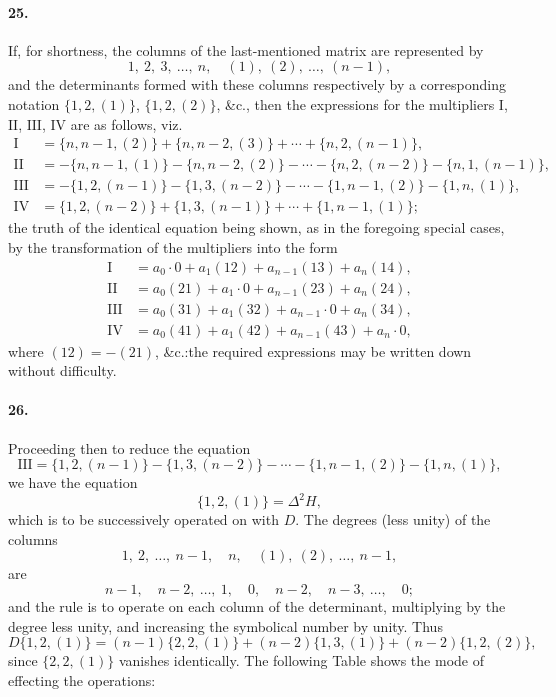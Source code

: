 \documentclass[12pt,a4paper]{article}
\theoremstyle{plain}
\begin{document}
\paragraph{25.}
If,  for  shortness,  the  columns  of  the  last-mentioned  matrix  are  represented  by
\[
1,\ 2,\ 3,\ \ldots,\ n,\quad (1),\ (2),\ \ldots,\ (n-1),
\]
and  the  determinants  formed  with  these  columns  respectively  by  a  corresponding
notation  $\{1, 2, (1)\}$, $\{1, 2, (2)\}$, \&c.,  then  the  expressions  for  the  multipliers  $\mathrm{I}$, $\mathrm{II}$, $\mathrm{III}$, $\mathrm{IV}$
are  as  follows,  viz.
\begin{align*}
\mathrm{I}   &= \{n, n-1, (2)\} + \{n, n-2, (3)\} + \cdots + \{n, 2, (n-1)\}, \\
\mathrm{II}  &= -\{n, n-1, (1)\} - \{n, n-2, (2)\} - \cdots - \{n, 2, (n-2)\} - \{n, 1, (n-1)\}, \\
\mathrm{III} &= -\{1, 2, (n-1)\} - \{1, 3, (n-2)\} - \cdots - \{1, n-1, (2)\} - \{1, n, (1)\}, \\
\mathrm{IV}  &= \{1, 2, (n-2)\} + \{1, 3, (n-1)\} + \cdots + \{1, n-1, (1)\};
\end{align*}
the  truth  of  the  identical  equation  being  shown,  as  in  the  foregoing  special  cases,  by
the  transformation  of  the  multipliers  into  the  form
\begin{align*}
\mathrm{I}   &= a_0 \cdot 0 + a_1(12) + a_{n-1}(13) + a_n(14), \\
\mathrm{II}  &= a_0(21) + a_1 \cdot 0 + a_{n-1}(23) + a_n(24), \\
\mathrm{III} &= a_0(31) + a_1(32) + a_{n-1} \cdot 0 + a_n(34), \\
\mathrm{IV}  &= a_0(41) + a_1(42) + a_{n-1}(43) + a_n \cdot 0,
\end{align*}
where  $(12) = -(21)$,  \&c.:\@  the  required  expressions  may  be  written  down  without
difficulty.

\paragraph{26.}
Proceeding  then  to  reduce  the  equation
\[
\mathrm{III} = \{1, 2, (n-1)\} - \{1, 3, (n-2)\} - \cdots - \{1, n-1, (2)\} - \{1, n, (1)\},
\]
we  have  the  equation
\[
\{1, 2, (1)\} = \Delta^2 H,
\]
which  is  to  be  successively  operated  on  with  $D$.  The  degrees  (less  unity)  of  the
columns
\[
1,\ 2,\ \ldots,\ n-1,\quad n,\quad (1),\ (2),\ \ldots,\ n-1,
\]
are
\[
n-1,\quad n-2,\ \ldots,\ 1,\quad 0,\quad n-2,\quad n-3,\ \ldots,\quad 0;
\]
and  the  rule  is  to  operate  on  each  column  of  the  determinant,  multiplying  by  the
degree  less  unity,  and  increasing  the  symbolical  number  by  unity.     Thus
\[
D\{1, 2, (1)\} = (n-1)\{2, 2, (1)\} + (n-2)\{1, 3, (1)\} + (n-2)\{1, 2, (2)\},
\]
since  $\{2, 2, (1)\}$  vanishes  identically.     The   following  Table   shows   the   mode   of  effecting
the  operations:
\end{document}
